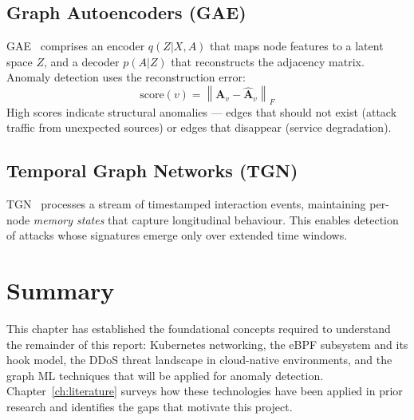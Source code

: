 \subsection{Graph Autoencoders (GAE)}
GAE~\cite{kipf2016vgae} comprises an encoder $q(Z|X,A)$ that maps node features to a
latent space $Z$, and a decoder $p(A|Z)$ that reconstructs the adjacency matrix. Anomaly
detection uses the reconstruction error:
\begin{equation}
  \text{score}(v) = \left\| \mathbf{A}_v - \hat{\mathbf{A}}_v \right\|_F
\end{equation}
High scores indicate structural anomalies --- edges that should not exist (attack traffic
from unexpected sources) or edges that disappear (service degradation).

\subsection{Temporal Graph Networks (TGN)}
TGN~\cite{rossi2020tgn} processes a stream of timestamped interaction events, maintaining
per-node \emph{memory states} that capture longitudinal behaviour. This enables detection
of attacks whose signatures emerge only over extended time windows.

\section{Summary}
This chapter has established the foundational concepts required to understand the
remainder of this report: Kubernetes networking, the eBPF subsystem and its hook model,
the DDoS threat landscape in cloud-native environments, and the graph ML techniques that
will be applied for anomaly detection. Chapter~\ref{ch:literature} surveys how these
technologies have been applied in prior research and identifies the gaps that motivate
this project.
